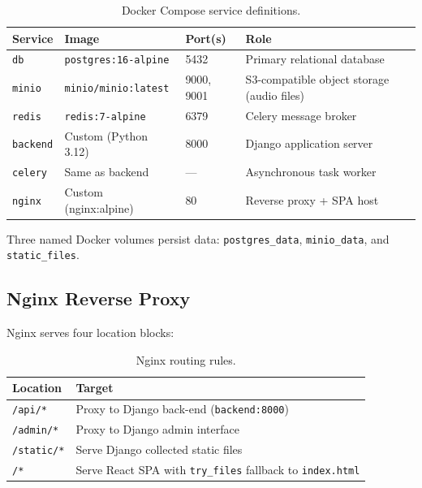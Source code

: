 \documentclass[12pt,a4paper]{article}
\begin{document}
\begin{table}[H]
\centering
\caption{Docker Compose service definitions.}
\label{tab:docker-services}
\begin{tabularx}{\textwidth}{l l l X}
\toprule
\textbf{Service} & \textbf{Image} & \textbf{Port(s)} & \textbf{Role} \\
\midrule
\texttt{db}      & \texttt{postgres:16-alpine} & 5432 & Primary relational database \\
\texttt{minio}   & \texttt{minio/minio:latest} & 9000, 9001 & S3-compatible object storage (audio files) \\
\texttt{redis}   & \texttt{redis:7-alpine}     & 6379 & Celery message broker \\
\texttt{backend} & Custom (Python 3.12)        & 8000 & Django application server \\
\texttt{celery}  & Same as backend             & ---  & Asynchronous task worker \\
\texttt{nginx}   & Custom (nginx:alpine)       & 80   & Reverse proxy + SPA host \\
\bottomrule
\end{tabularx}
\end{table}

Three named Docker volumes persist data: \texttt{postgres\_data},
\texttt{minio\_data}, and \texttt{static\_files}.

\subsection{Nginx Reverse Proxy}
\label{sec:nginx}

Nginx serves four location blocks:

\begin{table}[H]
\centering
\caption{Nginx routing rules.}
\label{tab:nginx-routes}
\begin{tabularx}{\textwidth}{l X}
\toprule
\textbf{Location} & \textbf{Target} \\
\midrule
\texttt{/api/*}    & Proxy to Django back-end (\texttt{backend:8000}) \\
\texttt{/admin/*}  & Proxy to Django admin interface \\
\texttt{/static/*} & Serve Django collected static files \\
\texttt{/*}        & Serve React SPA with \texttt{try\_files} fallback to \texttt{index.html} \\
\bottomrule
\end{tabularx}
\end{table}
\end{document}

